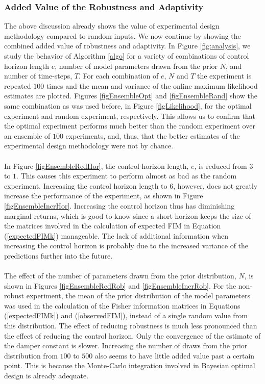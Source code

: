 \subsubsection{Added Value of the Robustness and Adaptivity}
The above discussion already shows the value of experimental design methodology compared to random inputs. We now continue by showing the combined added value of robustness and adaptivity. In Figure \ref{fig:analysis}, we study the behavior of Algorithm \ref{algo} for a variety of combinations of control horizon length $e$, number of model parameters drawn from the prior $N$, and number of time-steps, $T$. For each combination of $e$, $N$ and $T$ the experiment is repeated $100$ times and the mean and variance of the online maximum likelihood estimates are plotted. Figures \ref{figEnsembleOpt} and \ref{figEnsembleRand} show the same combination as was used before, in Figure \ref{figLikelihood}, for the optimal experiment and random experiment, respectively. This allows us to confirm that the optimal experiment performs much better than the random experiment over an ensemble of $100$ experiments, and, thus, that the better estimates of the experimental design methodology were not by chance.
\\
\\
In Figure \ref{figEnsembleRedHor}, the control horizon length, $e$, is reduced from $3$ to $1$. This causes this experiment to perform almost as bad as the random experiment. Increasing the control horizon length to $6$, however, does not greatly increase the performance of the experiment, as shown in Figure \ref{figEnsembleIncrHor}. Increasing the control horizon thus has diminishing marginal returns, which is good to know since a short horizon keeps the size of the matrices involved in the calculation of expected FIM in Equation (\ref{expectedFIMk}) manageable. The lack of additional information when increasing the control horizon is probably due to the increased variance of the predictions further into the future. 
\\
\\
The effect of the number of parameters drawn from the prior distribution, $N$, is shown in Figures \ref{figEnsembleRedRob} and \ref{figEnsembleIncrRob}. For the non-robust experiment, the mean of the prior distribution of the model parameters was used in the calculation of the Fisher information matrices in Equations (\ref{expectedFIMk}) and (\ref{observedFIM}), instead of a single random value from this distribution. The effect of reducing robustness is much less pronounced than the effect of reducing the control horizon. Only the convergence of the estimate of the damper constant is slower. Increasing the number of draws from the prior distribution from $100$ to $500$ also seems to have little added value past a certain point. This is because the Monte-Carlo integration involved in Bayesian optimal design is already adequate.
